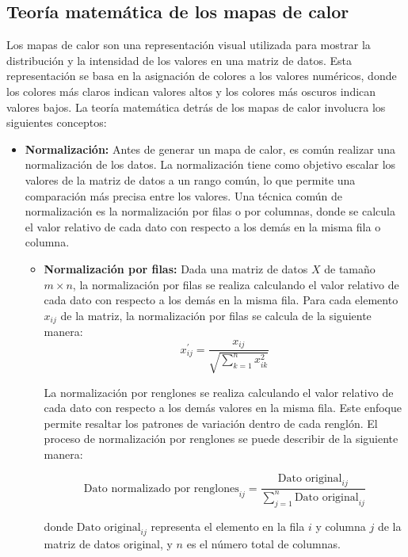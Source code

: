 \documentclass{article}
\begin{document}
\subsection{Teoría matemática de los mapas de calor}

Los mapas de calor son una representación visual utilizada para mostrar la distribución y la intensidad de los valores en una matriz de datos. Esta representación se basa en la asignación de colores a los valores numéricos, donde los colores más claros indican valores altos y los colores más oscuros indican valores bajos. La teoría matemática detrás de los mapas de calor involucra los siguientes conceptos:

\begin{itemize}
\item \textbf{Normalización: } Antes de generar un mapa de calor, es común realizar una normalización de los datos. La normalización tiene como objetivo escalar los valores de la matriz de datos a un rango común, lo que permite una comparación más precisa entre los valores. Una técnica común de normalización es la normalización por filas o por columnas, donde se calcula el valor relativo de cada dato con respecto a los demás en la misma fila o columna.
\begin{itemize}
\item \textbf{Normalización por filas:}
Dada una matriz de datos  $X$ de tamaño  $m \times n$,  la normalización por filas se realiza calculando el valor relativo de cada dato con respecto a los demás en la misma fila. Para cada elemento  $x_{ij}$ de la matriz, la normalización por filas se calcula de la siguiente manera: $$x_{ij}^{'} = \frac{x_{ij}}{\sqrt{\sum_{k=1}^{n} x_{ik}^2}}$$

La normalización por renglones se realiza calculando el valor relativo de cada dato con respecto a los demás valores en la misma fila. Este enfoque permite resaltar los patrones de variación dentro de cada renglón. El proceso de normalización por renglones se puede describir de la siguiente manera:

\begin{equation}
\textrm{Dato normalizado por renglones}_{ij} = \frac{\textrm{Dato original}_{ij}}{\sum_{j=1}^{n} \textrm{Dato original}_{ij}}
\end{equation}

donde $\textrm{Dato original}_{ij}$ representa el elemento en la fila $i$ y columna $j$ de la matriz de datos original, y $n$ es el número total de columnas.



\end{itemize}
\end{itemize}
\end{document}
